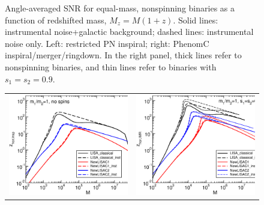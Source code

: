 \documentclass{iopart}
\begin{document}
\begin{figure}[H]
\begin{center}
\begin{tabular}{cc}
\end{tabular}
\caption{\label{fig:SNRMiniLISA} Angle-averaged SNR for equal-mass,
  nonspinning binaries as a function of redshifted mass, $M_z=M(1+z)$. Solid
  lines: instrumental noise+galactic background; dashed lines: instrumental
  noise only.  Left: restricted PN inspiral; right: {\sc PhenomC}
  inspiral/merger/ringdown. In the right panel, thick lines refer to
  nonspinning binaries, and thin lines refer to binaries with $s_1=s_2=0.9$.}
\end{center}
\end{figure}
%

%
\begin{figure}[H]
\begin{center}
\begin{tabular}{cc}
\includegraphics[scale=0.33,clip=true]{FigEmanuele/zhorNewLISAinsp.eps}
&\includegraphics[scale=0.33,clip=true]{FigEmanuele/zhorNewLISAIMR.eps}\\

\end{tabular}
\end{center}
\end{figure}
\end{document}
